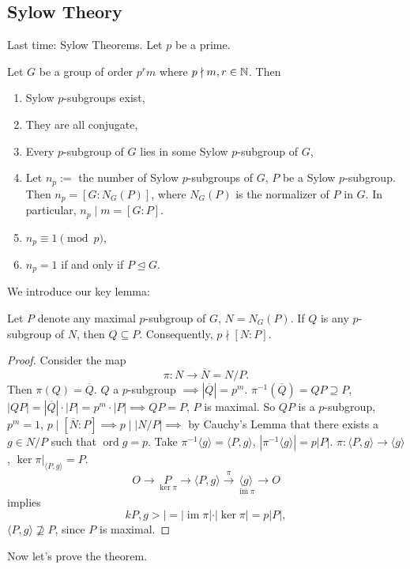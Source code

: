 \subsection{Sylow Theory}
Last time: Sylow Theorems. Let $p$ be a prime.
\begin{theorem}
    Let $G$ be a group of order $p^{r}m$ where $p \nmid m, r\in \mathbb{N}$. Then
    \begin{enumerate}
        \item Sylow $p$-subgroups exist,
        \item They are all conjugate,
        \item Every $p$-subgroup of $G$ lies in some Sylow $p$-subgroup of $G$,
        \item Let $n_p:=$ the number of Sylow $p$-subgroups of $G$, $P$ be a Sylow $p$-subgroup. Then $n_p=[G:N_G(P)]$, where $N_G(P)$ is the normalizer of $P$ in $G$. In particular, $n_p  \mid m = [G:P]$.
\item $n_p \equiv 1 \pmod p$,
        \item $n_p = 1$ if and only if $P \trianglelefteq G$.
    \end{enumerate}
\end{theorem}
We introduce our key lemma:
\begin{lemma}
    Let $P$ denote any maximal $p$-subgroup of $G$, $N=N_G(P) $. If $Q$ is any $p$-subgroup of $N$, then $Q \subseteq P$. Consequently, $p \nmid [N:P]$.
\end{lemma}
\begin{proof}
    Consider the map \[
    \pi \colon N \to \overline{N} = N /P.
\] Then $\pi(Q)=\overline{Q}.$ $Q$ a $p$-subgroup $\implies |\overline{Q}|=p^{m}$. $\pi^{-1}(\overline{Q})=QP \supseteq P$, $|QP|=|\overline{Q}|\cdot |P|=p^{m}\cdot |P| \implies QP=P$, $P$ is maximal. So $QP$ is a $p$-subgroup, $p^{m}=1$, $p \mid [\overline{N}:P]\implies p  \mid |N /P| \implies $ by Cauchy's Lemma that there exists a $g\in N /P$ such that $\operatorname{ord}g=p$. Take $\pi^{-1}\langle g \rangle =\langle P,g \rangle $, $|\pi^{-1}\langle g \rangle|=p |P|$. $\pi \colon \langle P,g \rangle  \to \langle g \rangle $, $\operatorname{ker}\pi|_{\langle P,g \rangle }=P$. \[
O \to \underset{\operatorname{ker}\pi}{P} \to \langle P,g \rangle \overset{\pi}{\to } \underset{\operatorname{im}\pi}{\langle g \rangle} \to O
\] implies \[
kP, g>|=|\operatorname{im}\pi|\cdot |\operatorname{ker}\pi|=p|P|,
\] $\langle P,g \rangle \not\supseteq P$, since $P$ is maximal.
\end{proof}
Now let's prove the theorem.
